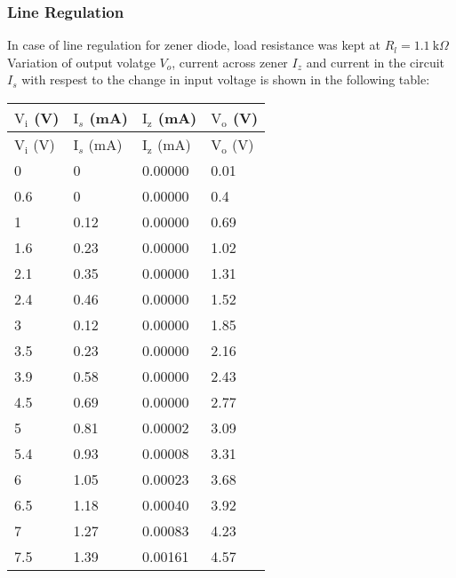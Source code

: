 \documentclass[12pt]{article}
\begin{document}
\subsubsection{Line Regulation}

In case of line regulation for zener diode, load resistance was kept at $R_l = 1.1 \ \text{k}\Omega$
Variation of output volatge $V_o$, current across zener $I_z$ and current in the circuit $I_s$ with respest to the change in input voltage is shown in the following table:
\begin{longtable}{|l|l|l|l|}
        \hline
        $\mathrm{V_i}$ (V) & $\text{I}_{s}$ (mA) & $\text{I}_\text{z}$ (mA) & $\text{V}_\text{o}$ (V) \\ \hline \hline
        \endfirsthead
        \hline
        $\mathrm{V_i}$ (V) & $\text{I}_{s}$ (mA) & $\text{I}_\text{z}$ (mA) & $\text{V}_\text{o}$ (V) \\ \hline \hline
        \endhead
        0      & 0       & 0.00000       & 0.01    \\ \hline
        0.6    & 0       & 0.00000       & 0.4     \\ \hline
        1      & 0.12    & 0.00000      & 0.69    \\ \hline
        1.6    & 0.23    & 0.00000       & 1.02    \\ \hline
        2.1    & 0.35    & 0.00000      & 1.31    \\ \hline
        2.4    & 0.46    & 0.00000       & 1.52    \\ \hline
        3      & 0.12    & 0.00000       & 1.85    \\ \hline
        3.5    & 0.23    & 0.00000       & 2.16    \\ \hline
        3.9    & 0.58    & 0.00000      & 2.43    \\ \hline
        4.5    & 0.69    & 0.00000       & 2.77    \\ \hline
        5      & 0.81    & 0.00002       & 3.09    \\ \hline
        5.4    & 0.93    & 0.00008       & 3.31    \\ \hline
        6      & 1.05    & 0.00023       & 3.68    \\ \hline
        6.5    & 1.18    & 0.00040       & 3.92    \\ \hline
        7      & 1.27    & 0.00083       & 4.23    \\ \hline
        7.5    & 1.39    & 0.00161       & 4.57    \\ \hline

\end{longtable}
\end{document}
